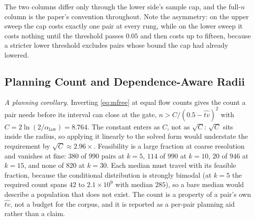 \documentclass[sigconf,anonymous,review]{acmart}
\newcommand{\alaw}{\ensuremath{\alpha_{\mathrm{law}}}}
\begin{document}
The two columns differ only through the lower side's sample cap, and
the full-$n$ column is the paper's convention throughout. Note the asymmetry: on
the upper sweep the cap costs exactly one pair at every rung, while on the lower
sweep it costs nothing until the threshold passes $0.05$ and then costs up to
fifteen, because a stricter lower threshold excludes pairs whose bound the cap
had already lowered.

\subsection{Planning Count and Dependence-Aware Radii}
\label{sec:appendix/track5}

\emph{A planning corollary.} Inverting \eqref{eq:mfree} at equal flow counts
gives the count a pair needs before its interval can close at the gate,
$n > C/(0.5-\widehat{tv})^2$ with $C = 2\ln(2/\alaw) = 8.764$. The constant
enters as $C$, not as $\sqrt{C}$: $\sqrt{C}$ sits inside the radius, so applying
it linearly to the solved form would understate the requirement by $\sqrt{C} \approx 2.96\times$.
Feasibility is a large fraction at coarse resolution and vanishes at fine:
$380$ of $990$ pairs at $k{=}5$, $114$ of $990$ at $k{=}10$, $20$ of $946$ at
$k{=}15$, and none of $820$ at $k{=}30$. Each median must travel with its
feasible fraction, because the conditional distribution is strongly bimodal (at
$k{=}5$ the required count spans $42$ to $2.1\times10^{9}$ with median
$285$), so a bare median would describe a population that does not exist.
The count is a property of a pair's own $\widehat{tv}$, not a budget for the
corpus, and it is reported as a per-pair planning aid rather than a claim.
\end{document}
